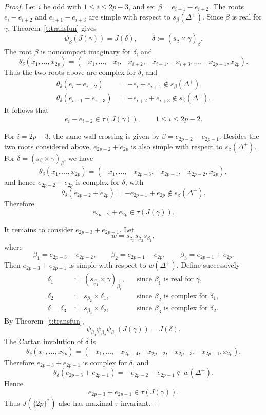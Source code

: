 \documentclass{amsart}
\theoremstyle{definition}
\begin{document}
\begin{proof}
Let \(i\) be odd with \(1\leq i\leq 2p-3\), and set
$\beta=e_{i+1}-e_{i+2}.$
The roots
$e_i-e_{i+2}$ and
$e_{i+1}-e_{i+3}$
are simple with respect to \(s_\beta(\Delta^+)\).
Since \(\beta\) is real for \(\gamma\), Theorem~\ref{t:transfun}
gives
\[
\psi_\beta(J(\gamma))
=
J(\delta),
\qquad
\delta:=(s_\beta\times\gamma)_\beta.
\]
The root \(\beta\) is noncompact imaginary for \(\delta\), and
\[
\theta_\delta(x_1,\ldots,x_{2p})
=
(-x_1,\ldots,-x_i,-x_{i+2},-x_{i+1},
-x_{i+3},\ldots,-x_{2p-1},x_{2p}).
\]
Thus the two roots above are complex for \(\delta\), and
\begin{align*}
\theta_\delta(e_i-e_{i+2})
&=-e_i+e_{i+1}
  \notin s_\beta(\Delta^+),\\
\theta_\delta(e_{i+1}-e_{i+3})
&=-e_{i+2}+e_{i+3}
  \notin s_\beta(\Delta^+).
\end{align*}
It follows that
\[
e_i-e_{i+2}\in\tau(J(\gamma)),
\qquad
1\leq i\leq2p-2.
\]

For \(i=2p-3\), the same wall crossing is given by
$\beta=e_{2p-2}-e_{2p-1}.$
Besides the two roots considered above,
\(e_{2p-2}+e_{2p}\) is also simple with respect to
\(s_\beta(\Delta^+)\). For
$\delta=(s_\beta\times\gamma)_\beta$, 
we have
\[
\theta_\delta(x_1,\ldots,x_{2p})
=
(-x_1,\ldots,-x_{2p-3},
-x_{2p-1},-x_{2p-2},x_{2p}),
\]
and hence \(e_{2p-2}+e_{2p}\) is complex for \(\delta\), with
\[
\theta_\delta(e_{2p-2}+e_{2p})
=
-e_{2p-1}+e_{2p}
\notin s_\beta(\Delta^+).
\]
Therefore
\[
e_{2p-2}+e_{2p}\in\tau(J(\gamma)).
\]

It remains to consider \(e_{2p-3}+e_{2p-1}\). Let
\[
w=s_{\beta_3}s_{\beta_2}s_{\beta_1},
\]
where
\[
\beta_1=e_{2p-3}-e_{2p-2},
\qquad
\beta_2=e_{2p-1}-e_{2p},
\qquad
\beta_3=e_{2p-1}+e_{2p}.
\]
Then \(e_{2p-3}+e_{2p-1}\) is simple with respect to
\(w(\Delta^+)\). Define successively
\begin{align*}
\delta_1
&:=(s_{\beta_1}\times\gamma)_{\beta_1},
&&\text{since \(\beta_1\) is real for \(\gamma\)},\\
\delta_2
&:=s_{\beta_2}\times\delta_1,
&&\text{since \(\beta_2\) is complex for \(\delta_1\)},\\
\delta=\delta_3
&:=s_{\beta_3}\times\delta_2,
&&\text{since \(\beta_3\) is complex for \(\delta_2\)}.
\end{align*}
By Theorem~\ref{t:transfun},
\[
\psi_{\beta_3}\psi_{\beta_2}\psi_{\beta_1}(J(\gamma))
=
J(\delta).
\]
The Cartan involution of \(\delta\) is
\[
\theta_\delta(x_1,\ldots,x_{2p})
=
(-x_1,\ldots,-x_{2p-4},
-x_{2p-2},-x_{2p-3},
-x_{2p-1},x_{2p}).
\]
Therefore \(e_{2p-3}+e_{2p-1}\) is complex for \(\delta\), and
\[
\theta_\delta(e_{2p-3}+e_{2p-1})
=
-e_{2p-2}-e_{2p-1}
\notin w(\Delta^+).
\]
Hence
\[
e_{2p-3}+e_{2p-1}\in\tau(J(\gamma)).
\]
Thus \(J(\{2p\}^*)\) also has maximal \(\tau\)-invariant.

\end{proof}
\end{document}
